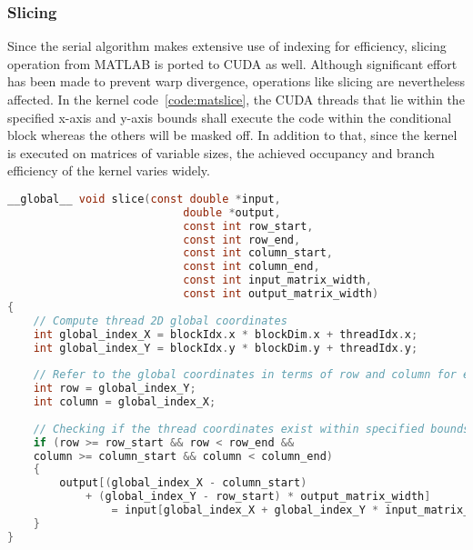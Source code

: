 \documentclass[thesis.tex]{subfiles}
\begin{document}
\subsubsection{Slicing}
Since the serial algorithm makes extensive use of indexing for efficiency, slicing operation from MATLAB is ported to CUDA as well. Although significant effort has been made to prevent warp divergence, operations like slicing are nevertheless affected. In the kernel code~\ref{code:matslice}, the CUDA threads that lie within the specified x-axis and y-axis bounds shall execute the code within the conditional block whereas the others will be masked off. In addition to that, since the kernel is executed on matrices of variable sizes, the achieved occupancy and branch efficiency of the kernel varies widely.
\lstset{aboveskip=10pt,belowskip=10pt} %
\begin{lstlisting}[language=C, caption={CUDA kernel for matrix slicing}, captionpos=b, label={code:matslice}]
__global__ void slice(const double *input,
						   double *output,
						   const int row_start,
						   const int row_end,
						   const int column_start,
						   const int column_end,
						   const int input_matrix_width,
						   const int output_matrix_width)
{
	// Compute thread 2D global coordinates
	int global_index_X = blockIdx.x * blockDim.x + threadIdx.x;
	int global_index_Y = blockIdx.y * blockDim.y + threadIdx.y;
	
	// Refer to the global coordinates in terms of row and column for ease
	int row = global_index_Y;
	int column = global_index_X;
	
	// Checking if the thread coordinates exist within specified bounds.
	if (row >= row_start && row < row_end && 
	column >= column_start && column < column_end) 
	{
		output[(global_index_X - column_start)
			+ (global_index_Y - row_start) * output_matrix_width]
				= input[global_index_X + global_index_Y * input_matrix_width];
	}
}
\end{lstlisting}
\end{document}
